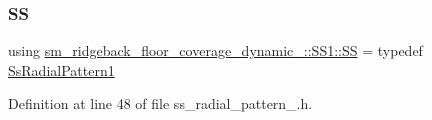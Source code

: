 \subsubsection{\texorpdfstring{SS}{SS}}
{\footnotesize\ttfamily using \hyperlink{namespacesm__ridgeback__floor__coverage__dynamic__1_1_1SS1_ab7908a02f2d8b027694a0e185b770dac}{sm\+\_\+ridgeback\+\_\+floor\+\_\+coverage\+\_\+dynamic\+\_\+::\+S\+S1\+::\+SS} = typedef \hyperlink{structsm__ridgeback__floor__coverage__dynamic__1_1_1SS1_1_1SsRadialPattern1}{Ss\+Radial\+Pattern1}}



Definition at line 48 of file ss\+\_\+radial\+\_\+pattern\+\_.\+h.

